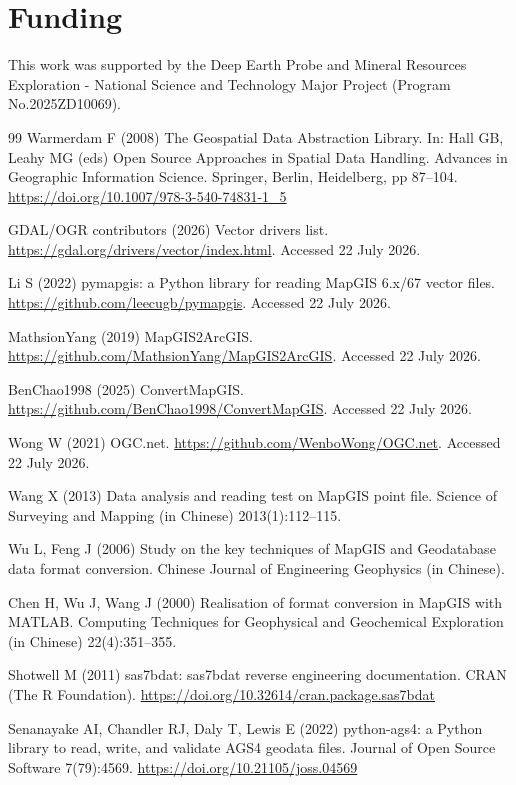 \documentclass[11pt,a4paper]{article}
\begin{document}
\section*{Funding}
This work was supported by the Deep Earth Probe and Mineral Resources Exploration - National Science and Technology Major Project (Program No.2025ZD10069).

\begin{thebibliography}{99}
Warmerdam F (2008) The Geospatial Data Abstraction Library. In: Hall GB, Leahy MG (eds) Open Source Approaches in Spatial Data Handling. Advances in Geographic Information Science. Springer, Berlin, Heidelberg, pp 87--104. \url{https://doi.org/10.1007/978-3-540-74831-1_5}

GDAL/OGR contributors (2026) Vector drivers list. \url{https://gdal.org/drivers/vector/index.html}. Accessed 22 July 2026.

Li S (2022) pymapgis: a Python library for reading MapGIS 6.x/67 vector files. \url{https://github.com/leecugb/pymapgis}. Accessed 22 July 2026.

MathsionYang (2019) MapGIS2ArcGIS. \url{https://github.com/MathsionYang/MapGIS2ArcGIS}. Accessed 22 July 2026.

BenChao1998 (2025) ConvertMapGIS. \url{https://github.com/BenChao1998/ConvertMapGIS}. Accessed 22 July 2026.

Wong W (2021) OGC.net. \url{https://github.com/WenboWong/OGC.net}. Accessed 22 July 2026.

Wang X (2013) Data analysis and reading test on MapGIS point file. Science of Surveying and Mapping (in Chinese) 2013(1):112--115.

Wu L, Feng J (2006) Study on the key techniques of MapGIS and Geodatabase data format conversion. Chinese Journal of Engineering Geophysics (in Chinese).

Chen H, Wu J, Wang J (2000) Realisation of format conversion in MapGIS with MATLAB. Computing Techniques for Geophysical and Geochemical Exploration (in Chinese) 22(4):351--355.

Shotwell M (2011) sas7bdat: sas7bdat reverse engineering documentation. CRAN (The R Foundation). \url{https://doi.org/10.32614/cran.package.sas7bdat}

Senanayake AI, Chandler RJ, Daly T, Lewis E (2022) python-ags4: a Python library to read, write, and validate AGS4 geodata files. Journal of Open Source Software 7(79):4569. \url{https://doi.org/10.21105/joss.04569}


\end{thebibliography}
\end{document}
